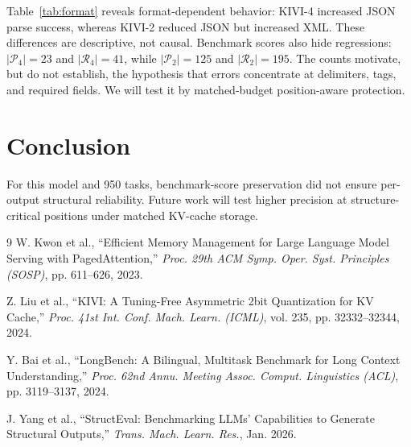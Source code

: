 \documentclass[twocolumn,a4paper]{ieicejsp}
\begin{document}
Table~\ref{tab:format} reveals format-dependent behavior: KIVI-4 increased
JSON parse success, whereas KIVI-2 reduced JSON but increased XML.  These
differences are descriptive, not causal.  Benchmark scores also hide
regressions: $|\mathcal{P}_4|=23$ and $|\mathcal{R}_4|=41$, while
$|\mathcal{P}_2|=125$ and $|\mathcal{R}_2|=195$.  The counts motivate, but do
not establish, the hypothesis that errors concentrate at delimiters, tags, and
required fields.  We will test it by matched-budget position-aware protection.

\section{Conclusion}
For this model and 950 tasks, benchmark-score preservation did not ensure
per-output structural reliability.  Future work will test higher precision at
structure-critical positions under matched KV-cache storage.

\scriptsize
\begin{thebibliography}{9}
\setlength{\itemsep}{0pt}
\setlength{\parsep}{0pt}
\setlength{\topsep}{0pt}
W. Kwon et al., ``Efficient Memory Management for Large Language Model Serving
with PagedAttention,'' \emph{Proc. 29th ACM Symp. Oper. Syst. Principles
(SOSP)}, pp. 611--626, 2023.

Z. Liu et al., ``KIVI: A Tuning-Free Asymmetric 2bit Quantization for KV
Cache,'' \emph{Proc. 41st Int. Conf. Mach. Learn. (ICML)}, vol. 235,
pp. 32332--32344, 2024.

Y. Bai et al., ``LongBench: A Bilingual, Multitask Benchmark for Long Context
Understanding,'' \emph{Proc. 62nd Annu. Meeting Assoc. Comput. Linguistics
(ACL)}, pp. 3119--3137, 2024.

J. Yang et al., ``StructEval: Benchmarking LLMs' Capabilities to Generate
Structural Outputs,'' \emph{Trans. Mach. Learn. Res.}, Jan. 2026.
\end{thebibliography}
\end{document}
